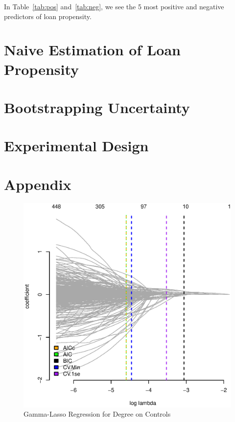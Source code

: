 \documentclass[11pt, fleqn]{article}
\begin{document}
In Table~\ref{tab:pos} and~\ref{tab:neg}, we see the 5 most positive and negative predictors of loan propensity. 




\section{Naive Estimation of Loan Propensity}

\section{Bootstrapping Uncertainty}

\section{Experimental Design}

\section{Appendix}

\begin{figure}[!htb]
  \centering
  \includegraphics[scale=.5]{treat_aic.eps}
  \caption{Gamma-Lasso Regression for Degree on Controls}
  \label{fig:treat_aic}
\end{figure}
\end{document}

